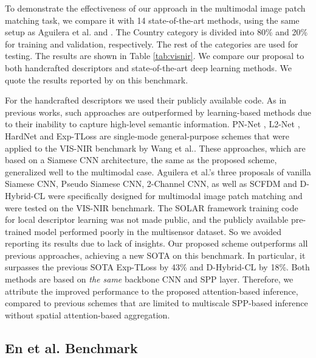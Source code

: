 \documentclass[10pt,journal]{IEEEtran}\usepackage{amsfonts}
\begin{document}
To demonstrate the effectiveness of our approach in the multimodal image
patch matching task, we compare it with 14 state-of-the-art methods, using
the same setup as Aguilera et al. \cite{SiameseCrossSpectral} and \cite {TS-net, Q-net, multisensor}. The Country category is divided into 80\% and
20\% for training and validation, respectively. The rest of the categories
are used for testing. The results are shown in Table \ref{tab:visnir}. We
compare our proposal to both handcrafted descriptors \cite{SIFT, MI_SIFT,
LGHD} and state-of-the-art deep learning methods. We quote the results
reported by \cite{BetterAndFaster, multisensor} on this benchmark.

For the handcrafted descriptors \cite{SIFT, MI_SIFT, LGHD} we used their
publicly available code. As in previous works, such approaches are
outperformed by learning-based methods due to their inability to capture
high-level semantic information. PN-Net \cite{PN_net}, L2-Net \cite{L2Net},
HardNet \cite{HardNet} and Exp-TLoss \cite{BetterAndFaster} are single-mode
general-purpose schemes that were applied to the VIS-NIR benchmark by Wang
et al.\cite{BetterAndFaster}. These approaches, which are based on a Siamese
CNN architecture, the same as the proposed scheme, generalized well to the
multimodal case. Aguilera et al.'s three proposals \cite {SiameseCrossSpectral} of vanilla Siamese CNN, Pseudo Siamese CNN, 2-Channel
CNN, as well as SCFDM \cite{SCFDM} and D-Hybrid-CL \cite{multisensor} were
specifically designed for multimodal image patch matching and were tested on
the VIS-NIR benchmark. The SOLAR framework training code for local
descriptor learning \cite{SOLAR} was not made public, and the publicly
available pre-trained model performed poorly in the multisensor dataset. So
we avoided reporting its results due to lack of insights. Our proposed
scheme outperforms all previous approaches, achieving a new SOTA on this
benchmark. In particular, it surpasses the previous SOTA Exp-TLoss \cite {BetterAndFaster} by 43\% and D-Hybrid-CL \cite{multisensor} by 18\%. Both
methods are based on \textit{the same} backbone CNN and SPP layer.
Therefore, we attribute the improved performance to the proposed
attention-based inference, compared to previous schemes \cite {BetterAndFaster,multisensor} that are limited to multiscale SPP-based
inference without spatial attention-based aggregation.

\subsection{En et al. Benchmark}
\end{document}
